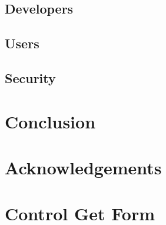 \documentclass{sig-alternate}
\begin{document}


\subsection{Developers}



\subsection{Users}



\subsection{Security}



\section{Conclusion}

\section{Acknowledgements}

\nocite{*}



\clearpage
\newpage

\onecolumn
\appendix
\section{Control Get Form}
\label{appendix_a}


\end{document}
